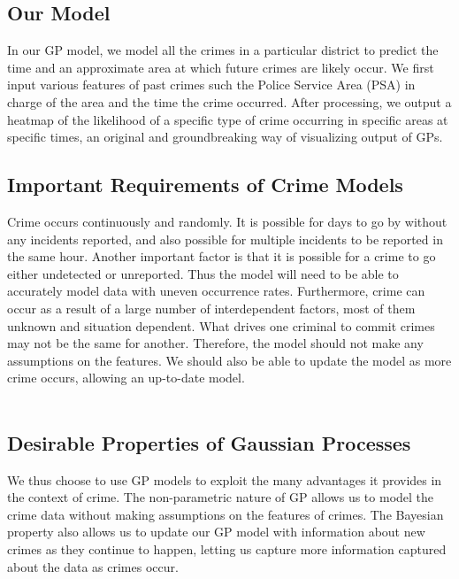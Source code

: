 \documentclass[letterpaper]{article}
\begin{document}
	\subsection{Our Model}
	
	In our GP model, we model all the crimes in a particular district to predict the time and an approximate area at which future crimes are likely occur.
	We first input various features of past crimes such the Police Service Area (PSA) in charge of the area and the time the crime occurred.
	After processing, we output a heatmap of the likelihood of a specific type of crime occurring in specific areas at specific times, an original and groundbreaking way of visualizing output of GPs.
	
	\subsection{Important Requirements of Crime Models}
	
	Crime occurs continuously and randomly. It is possible for days to go by without any incidents reported, and also possible for multiple incidents to be reported in the same hour.
	Another important factor is that it is possible for a crime to go either undetected or unreported. Thus the model will need to be able to accurately model data with uneven occurrence rates.
	Furthermore, crime can occur as a result of a large number of interdependent factors, most of them unknown and situation dependent. What drives one criminal to commit crimes may not be the same for another.
	Therefore, the model should not make any assumptions on the features. We should also be able to update the model as more crime occurs, allowing an up-to-date model.\\ \\
	\blindtext
	
	\subsection{Desirable Properties of Gaussian Processes}
	
	We thus choose to use GP models to exploit the many advantages it provides in the context of crime.
	The non-parametric nature of GP allows us to model the crime data without making assumptions on the features of crimes.
	The Bayesian property also allows us to update our GP model with information about new crimes as they continue to happen, letting us capture more information captured about the data as crimes occur.\\ \\
\end{document}
